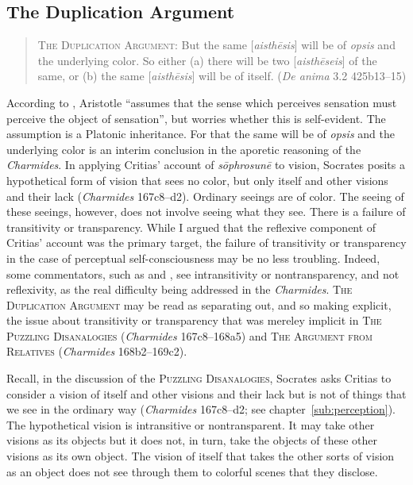 
\subsection{The Duplication Argument} %
\label{sub:the_duplication_argument}

\begin{quote}
	\textsc{The Duplication Argument}: But the same [\emph{aisthēsis}] will be of \emph{opsis} and the underlying color. So either (a) there will be two [\emph{aisthēseis}] of the same, or (b) the same [\emph{aisthēsis}] will be of itself. (\emph{De anima} 3.2 425b13–15)
\end{quote}

According to \citet[435]{Hicks:1907uq}, Aristotle ``assumes that the sense which perceives sensation must perceive the object of sensation'', but worries whether this is self-evident. The assumption is a Platonic inheritance. For that the same will be of \emph{opsis} and the underlying color is an interim conclusion in the aporetic reasoning of the \emph{Charmides}. In applying Critias' account of \emph{sōphrosunē} to vision, Socrates posits a hypothetical form of vision that sees no color, but only itself and other visions and their lack (\emph{Charmides} 167c8–d2). Ordinary seeings are of color. The seeing of these seeings, however, does not involve seeing what they see. There is a failure of transitivity or transparency.  While I argued that the reflexive component of Critias' account was the primary target, the failure of transitivity or transparency in the case of perceptual self-consciousness may be no less troubling. Indeed, some commentators, such as \citealt[202–3]{Sorabji:2006aa} and \citealt{Tsouna:2022aa}, see intransitivity or nontransparency, and not reflexivity, as the real difficulty being addressed in the \emph{Charmides}. \textsc{The Duplication Argument} may be read as separating out, and so making explicit, the issue about transitivity or transparency that was mereley implicit in \textsc{The Puzzling Disanalogies} (\emph{Charmides} 167c8–168a5) and \textsc{The Argument from Relatives} (\emph{Charmides} 168b2–169c2).

Recall, in the discussion of the \textsc{Puzzling Disanalogies}, Socrates asks Critias to consider a vision of itself and other visions and their lack but is not of things that we see in the ordinary way (\emph{Charmides} 167c8–d2; see chapter~\ref{sub:perception}). The hypothetical vision is intransitive or nontransparent. It may take other visions as its objects but it does not, in turn, take the objects of these other visions as its own object. The vision of itself that takes the other sorts of vision as an object does not see through them to colorful scenes that they disclose.

